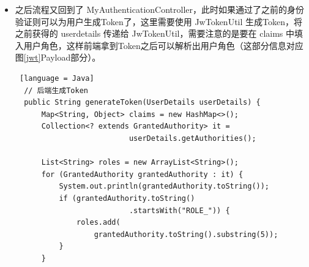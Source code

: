 \begin{enumerate}
\begin{itemize}
\begin{lstlisting} [language = Java]
    public boolean supports(Class<?> authentication) {
        return XXXUsernamePasswordAutenticationToken
                .class
                .isAssignableFrom(authentication);
    }
              \end{lstlisting}
                DaoAuthenticationProvider 是继承 AbstractUserDetailsAuthenticationProvider 的，不同在于 DaoAuthenticationProvider 增加了验证密码的功能，这也正是我们需要的，但是验证密码需要查询数据库也就需要 UserDetailService，所以需要通过 MySecurityConfig 为 XXXAuthProvider 注入不同的 XXXUserDetialsService。这里选择setter注入：
                \begin{lstlisting} [language = Java]
  // XXXDaoAuthProvider
  @Override
  public void setUserDetailsService(
      UserDetailsService userDetailsService) {
      super.setUserDetailsService(userDetailsService);
  }
              \end{lstlisting}
                \begin{lstlisting} [language = Java]
  // MySecurityConfig
  @Autowired
  @Qualifier("XXXUserDetailsService")
  private UserDetailsService XXXUserDetailsService;

  // 注入
  @Bean("XXXDaoAutenticationProvider")
  DaoAuthenticationProvider daoXXXDaoAutenticationProvider() 
  {
    return new XXXDaoAutenticationProvider(
                                passwordEncoder(), 
                                XXXUserDetailsService);
  }
              \end{lstlisting}
                这个过程中涉及的类比较多且关系比较复杂，可以参考图\ref{SpringSecurityMultiUser}（经过简化，略去了与该流程相关程度不大的类）。
          \item 之后流程又回到了 MyAuthenticationController，此时如果通过了之前的身份验证则可以为用户生成Token了，这里需要使用 JwTokenUtil 生成Token，将 之前获得的 userdetails 传递给 JwTokenUtil，需要注意的是要在 claims 中填入用户角色，这样前端拿到Token之后可以解析出用户角色（这部分信息对应图\ref{jwt}Payload部分）。
                \begin{lstlisting} [language = Java]
  // 后端生成Token
  public String generateToken(UserDetails userDetails) {
      Map<String, Object> claims = new HashMap<>();
      Collection<? extends GrantedAuthority> it = 
                          userDetails.getAuthorities();

      List<String> roles = new ArrayList<String>();
      for (GrantedAuthority grantedAuthority : it) {
          System.out.println(grantedAuthority.toString());
          if (grantedAuthority.toString()
                          .startsWith("ROLE_")) {
              roles.add(
                  grantedAuthority.toString().substring(5));
          }
      }
      

\end{lstlisting}
\end{itemize}
\end{enumerate}
